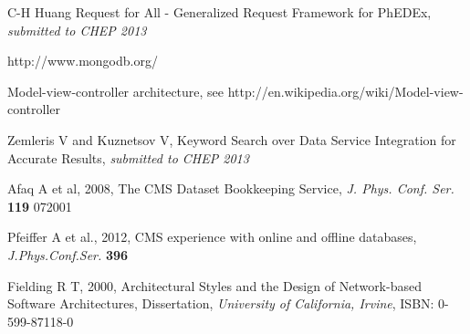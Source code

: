 \begin{thebibliography}{1}
C-H Huang Request for All - Generalized Request Framework for PhEDEx,
{\it submitted to CHEP 2013}

http://www.mongodb.org/

 Model-view-controller architecture, see
http://en.wikipedia.org/wiki/Model-view-controller

 Zemleris V and Kuznetsov V,
Keyword Search over Data Service Integration for Accurate Results,
{\it submitted to CHEP 2013}

 Afaq A et al, 2008, The CMS Dataset Bookkeeping Service, 
{\it J. Phys. Conf. Ser.} 
{\bf 119} 072001

 Pfeiffer A et al., 2012, CMS experience with online and offline databases, 
{\it J.Phys.Conf.Ser.} 
{\bf 396}

 Fielding R T, 2000, Architectural Styles and the Design of Network-based Software Architectures, Dissertation, 
{\it University of California, Irvine}, 
ISBN: 0-599-87118-0

\end{thebibliography}
